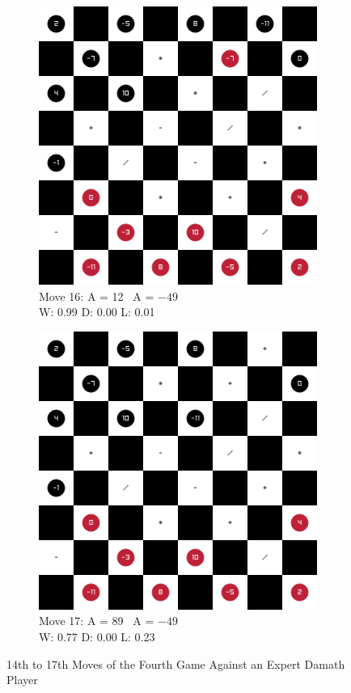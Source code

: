 \begin{figure}[H]
\begin{subfigure}{0.3\textwidth}
        \includegraphics[width=\textwidth]{images/games/game4/move_16.png}
        \caption*{Move 16: A = 12 \textbar\ A = $-49$ \\ W: 0.99 D: 0.00 L: 0.01}
    \end{subfigure}
    \quad
    \begin{subfigure}{0.3\textwidth}
        \centering
        \includegraphics[width=\textwidth]{images/games/game4/move_17.png}
        \caption*{Move 17: A = 89 \textbar\ A = $-49$ \\ W: 0.77 D: 0.00 L: 0.23}
    \end{subfigure}
    \caption{14th to 17th Moves of the Fourth Game Against an Expert Damath Player}
    \label{fig:14-17-game4}
\end{figure}

